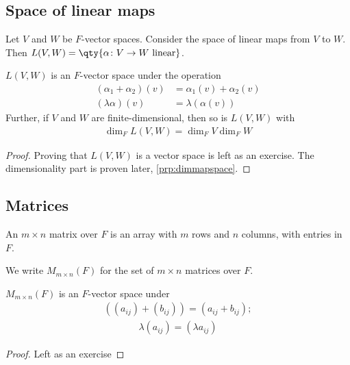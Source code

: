     \subsection{Space of linear maps}
    Let $V$ and $W$ be $F$-vector spaces.
    Consider the space of linear maps from $V$ to $W$.
    Then $L(V,W) = \qty{\alpha \colon V \to W \text{ linear}}$.
    \begin{proposition}
        $L(V,W)$ is an $F$-vector space under the operation
        \begin{align*}
            (\alpha_1 + \alpha_2)(v) &= \alpha_1(v) + \alpha_2(v) \\
            (\lambda \alpha)(v) &= \lambda( \alpha(v) )
        \end{align*}
        Further, if $V$ and $W$ are finite-dimensional, then so is $L(V,W)$ with
        \begin{align*}
            \dim_F L(V,W) = \dim_F V \dim_F W
        \end{align*}
    \end{proposition}
    \begin{proof}
        Proving that $L(V,W)$ is a vector space is left as an exercise.
        The dimensionality part is proven later, \cref{prp:dimmapspace}.
    \end{proof}

    \subsection{Matrices}
    \begin{definition}[Matrix]
        An $m \times n$ matrix over $F$ is an array with $m$ rows and $n$ columns, with entries in $F$.
    \end{definition}
    \begin{notation}
        We write $M_{m \times n}(F)$ for the set of $m \times n$ matrices over $F$.
    \end{notation} 

    \begin{proposition}
        $M_{m \times n}(F)$ is an $F$-vector space under
        \begin{align*}
            ((a_{ij}) + (b_{ij})) = (a_{ij} + b_{ij});
        \end{align*}
        \begin{align*}
            \lambda (a_{ij}) = (\lambda a_{ij})
        \end{align*}
    \end{proposition}
    \begin{proof}
        Left as an exercise
    \end{proof}


